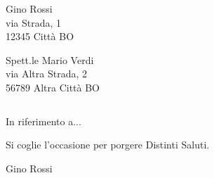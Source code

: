 \documentclass[a4paper,12pt]{letter}
\begin{document}

\begin{letter}{}

 \begin{flushleft}
    Gino Rossi\\ via Strada, 1\\ 12345 Citt\`a BO
  \end{flushleft}
\vspace{1cm}

 

\begin{flushright}
 Spett.le Mario Verdi\\ via Altra Strada, 2\\56789 Altra Citt\`a BO
\end{flushright}

 \opening{$$$$}
In riferimento a...

Si coglie l'occasione per porgere Distinti Saluti.

\vspace{1.5cm}

\begin{flushright}
 Gino Rossi
\end{flushright}


\closing{$$$$}


\end{letter}
\end{document}
